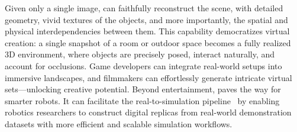 Given only a single image, \methodname can faithfully reconstruct the scene, with detailed geometry, vivid textures of the objects, and more importantly, the spatial and physical interdependencies between them. 
This capability democratizes virtual creation: a single snapshot of a room or outdoor space becomes a fully realized 3D environment, where objects are precisely posed, interact naturally, and account for occlusions. Game developers can integrate real-world setups into immersive landscapes, and filmmakers can effortlessly generate intricate virtual sets—unlocking creative potential.
Beyond entertainment, \methodname paves the way for smarter robots. It can facilitate the real-to-simulation pipeline~\cite{li2024evaluating,torne2024reconciling} by enabling robotics researchers to construct digital replicas from real-world demonstration datasets with more efficient and scalable simulation workflows.









